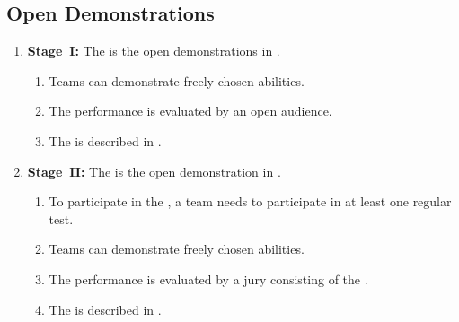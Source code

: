 \subsection{Open Demonstrations}
\label{sec:open-demonstrations}
\begin{enumerate}
	\item \textbf{Stage~I:} The  is the open demonstrations in .
	\begin{enumerate}
		\item Teams can demonstrate freely chosen abilities. 
		\item The performance is evaluated by an open audience.
		\item The  is described in .
	\end{enumerate}

	\item \textbf{Stage~II:} The  is the open demonstration in .
	\begin{enumerate}
		\item To participate in the , a team needs to participate in at least one regular  test.
		\item Teams can demonstrate freely chosen abilities. 
		\item The performance is evaluated by a jury consisting of the .
		\item The  is described in .
	\end{enumerate}

	

\end{enumerate}
